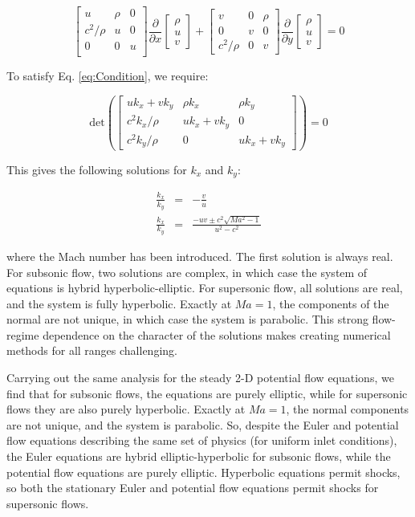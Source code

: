 \documentclass[10pt]{article}
\newcommand{\beq}{\begin{equation}}
\newcommand{\eeq}{\end{equation}}
\begin{document}
\begin{flushleft}
\beq
\begin{bmatrix}
u & \rho & 0\\
c^2/\rho & u & 0\\
0 & 0 & u\\
\end{bmatrix}
\frac{\partial}{\partial x}\begin{bmatrix}\rho \\ u \\ v\end{bmatrix}+
\begin{bmatrix}
v & 0 & \rho\\
0 & v & 0\\
c^2/\rho & 0 & v
\end{bmatrix}
\frac{\partial}{\partial y}\begin{bmatrix}\rho \\ u \\ v\end{bmatrix}=0
\eeq

To satisfy Eq. \eqref{eq:Condition}, we require:

\beq
\text{det}\left(\begin{bmatrix}
uk_x+vk_y & \rho k_x & \rho k_y\\
c^2k_x/\rho & uk_x+vk_y & 0\\
c^2k_y/\rho & 0 & uk_x+vk_y
\end{bmatrix}\right)=0
\eeq

This gives the following solutions for \(k_x\) and \(k_y\):

\begin{subequations}
\begin{eqnarray}
\frac{k_x}{k_y}&=&-\frac{v}{u}\\
\frac{k_x}{k_y}&=&\frac{-uv\pm c^2\sqrt{Ma^2-1}}{u^2-c^2}
\end{eqnarray}
\end{subequations}

where the Mach number has been introduced. The first solution is always real. For subsonic flow, two solutions are complex, in which case the system of equations is hybrid hyperbolic-elliptic. For supersonic flow, all solutions are real, and the system is fully hyperbolic. Exactly at \(Ma=1\), the components of the normal are not unique, in which case the system is parabolic. This strong flow-regime dependence on the character of the solutions makes creating numerical methods for all ranges challenging. 

Carrying out the same analysis for the steady 2-D potential flow equations, we find that for subsonic flows, the equations are purely elliptic, while for supersonic flows they are also purely hyperbolic. Exactly at \(Ma=1\), the normal components are not unique, and the system is parabolic. So, despite the Euler and potential flow equations describing the same set of physics (for uniform inlet conditions), the Euler equations are hybrid elliptic-hyperbolic for subsonic flows, while the potential flow equations are purely elliptic. Hyperbolic equations permit shocks, so both the stationary Euler and potential flow equations permit shocks for supersonic flows.


\end{flushleft}
\end{document}
